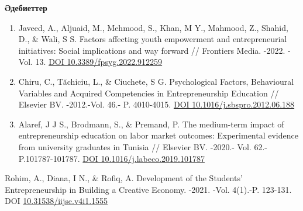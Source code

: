 \begin{center}
  {\bfseries Әдебиеттер}
  \end{center}
  
  \begin{references}

\begin{enumerate}
\def\labelenumi{\arabic{enumi}.}
\item
  Javeed, A., Aljuaid, M., Mehmood, S., Khan, M Y., Mahmood, Z., Shahid,
  D., \& Wali, S S. Factors affecting youth empowerment and
  entrepreneurial initiatives: Social implications and way forward //
  Frontiers Media. -2022. -Vol. 13.
  \href{https://doi.org/10.3389/fpsyg.2022.912259}{DOI
  10.3389/fpsyg.2022.912259}
\item
  Chiru, C., Tăchiciu, L., \& Ciuchete, S G. Psychological Factors,
  Behavioural Variables and Acquired Competencies in Entrepreneurship
  Education // Elsevier BV. -2012.-Vol. 46.- P. 4010-4015.
  \href{https://doi.org/10.1016/j.sbspro.2012.06.188}{DOI
  10.1016/j.sbspro.2012.06.188}
\item
  Alaref, J J S., Brodmann, S., \& Premand, P. The medium-term impact of
  entrepreneurship education on labor market outcomes: Experimental
  evidence from university graduates in Tunisia // Elsevier BV. -2020.-
  Vol. 62.- P.101787-101787.
  \href{https://doi.org/10.1016/j.labeco.2019.101787}{DOI
  10.1016/j.labeco.2019.101787}
\end{enumerate}

Rohim, A., Diana, I N., \& Rofiq, A. Development of the Students'
Entrepreneurship in Building a Creative Economy. -2021. -Vol. 4(1).-P.
123-131. DOI
\href{https://doi.org/10.31538/iijse.v4i1.1555}{10.31538/iijse.v4i1.1555}


\end{references}
